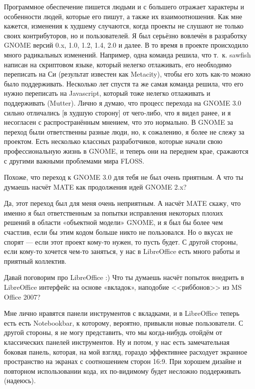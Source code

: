 \documentclass[10pt, a5paper]{article}
\begin{document}
\begin{Parallel}[p]{}{}
{\a Программное обеспечение пишется людьми и с большего отражает характеры и особенности людей, которые его пишут, а также их взаимоотношения. Как мне кажется, изменения к худшему случаются, когда проекты не слушают не только своих контрибуторов, но и пользователей. Я был серьёзно вовлечён в разработку GNOME версий 0.x, 1.0, 1.2, 1.4, 2.0 и далее. В то время в проекте происходило много радикальных изменений. Например, одна команда решила, что т.~к. sawfish написан на скриптовом языке, который нелегко отлаживать, его необходимо переписать на Си (результат известен как Metacity), чтобы его хоть как-то можно было поддерживать. Несколько лет спустя та же самая команда решила, что его нужно переписать на Javascript, который тоже нелегко отлаживать и поддерживать (Mutter). Лично я думаю, что процесс перехода на GNOME 3.0 сильно отличались [в худшую сторону] от чего-либо, что я видел ранее, и я несогласен с распространённым мнением, что это нормально. В GNOME за переход были ответственны разные люди, но, к сожалению, я более не слежу за проектом. Есть несколько классных разработчиков, которые начали свою профессиональную жизнь в GNOME, и теперь они на переднем крае, сражаются с другими важными проблемами мира FLOSS.

\q Похоже, что переход к GNOME 3.0 для тебя не был очень приятным. А что ты думаешь насчёт MATE как продолжения идей GNOME 2.x?

\a Да, этот переход был для меня очень неприятным. А насчёт MATE скажу, что именно я был ответственным за попытки исправления некоторых плохих решений в области «объектной модели» GNOME, и я был бы более чем счастлив, если бы этим кодом больше никто не пользовался. Но о вкусах не спорят — если этот проект кому-то нужен, то пусть будет. С другой стороны, если кому-то хочется чем-то заняться, у нас в LibreOffice есть много работы и приятный коллектив.

\q Давай поговорим про LibreOffice :) Что ты думаешь насчёт попыток внедрить в LibreOffice интерфейс на основе «вкладок», наподобие <<риббонов>> из MS Office 2007?

\a Мне лично нравятся панели инструментов с вкладками, и в LibreOffice теперь есть есть Notebookbar, к которому, вероятно, привыкли новые пользователи. С другой стороны, я не могу представить, что мы когда-нибудь отойдём от классических панелей инструментов. Ну и потом, у нас есть замечательная боковая панель, которая, на мой взгляд, гораздо эффективнее расходует экранное пространство на экранах с соотношением сторон 16:9. При хорошем дизайне и повторном использовании кода, их по-видимому будет несложно поддерживать (надеюсь).

}
\end{Parallel}
\end{document}
